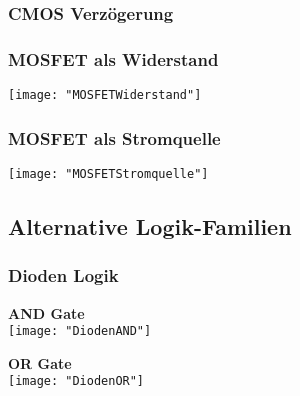 \subsubsection{CMOS Verzögerung}
\begin{minipage}[t]{0.45\textwidth}
	\vspace{0pt}								%
	\subsubsection{MOSFET als Widerstand}
	\texttt{[image: "MOSFETWiderstand"]}
\end{minipage}\hspace{0.05\textwidth}
\begin{minipage}[t]{0.45\textwidth}
	\vspace{0pt}								%
	\subsubsection{MOSFET als Stromquelle}
	\texttt{[image: "MOSFETStromquelle"]}
\end{minipage}
\vspace{2mm}


\subsection{Alternative Logik-Familien}
\subsubsection{Dioden Logik}
\begin{minipage}[t]{0.34\textwidth}
	\vspace{0pt}
	\textbf{AND Gate}\\
	\texttt{[image: "DiodenAND"]}
\end{minipage}
\begin{minipage}[t]{0.34\textwidth}
	\vspace{0pt}
	\textbf{OR Gate}\\
	\texttt{[image: "DiodenOR"]}
\end{minipage}
\vspace{2mm}


